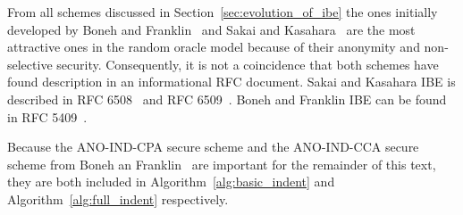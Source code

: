 From all schemes discussed in Section~\ref{sec:evolution_of_ibe} the ones initially developed by Boneh and Franklin~\cite{art:BonehF01} and Sakai and Kasahara~\cite{art:SakaiK03} are the most attractive ones in the random oracle model because of their anonymity and non-selective security. Consequently, it is not a coincidence that both schemes have found description in an informational RFC document. Sakai and Kasahara IBE is described in RFC 6508~\cite{rfc6508} and RFC 6509~\cite{rfc6509}. Boneh and Franklin IBE can be found in RFC 5409~\cite{rfc5409}. 

Because the ANO-IND-CPA secure scheme and the ANO-IND-CCA secure scheme from Boneh an Franklin~\cite{art:BonehF01} are important for the remainder of this text, they are both included in Algorithm~\ref{alg:basic_indent} and Algorithm~\ref{alg:full_indent} respectively.

